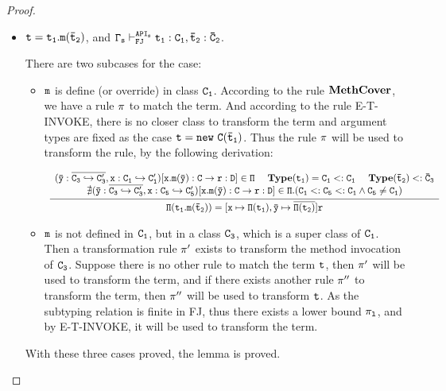\documentclass[letterpaper]{article}
\newcommand{\env}[2]{\vdash_{#1}^{#2}}
\begin{document}
\begin{proof}
\begin{itemize}
  \item $\tt t = t_1.m(\bar{t}_2)$, and $\tt \Gamma_s\env{FJ}{API_s}t_1:C_1,\bar{t}_2:\bar{C}_2$.
  
  There are two subcases for the case:
    \begin{itemize}
      \item $\tt m$ is define (or override) in class $\tt C_1$. According to the rule $\tt \mathbf{MethCover}$, we have a rule $\tt \pi$ to match the term. And according to the rule E-T-INVOKE, there is no closer class to transform the term and argument types are fixed as the case $\tt t=new~C(\bar{t}_1)$. Thus the rule $\tt \pi$ will be used to transform the rule, by the following derivation:

      \[
        \begin{array}{c}
          \infer
          {\tt \Pi(t_1.m(\bar{t}_2))=[x\mapsto\Pi(t_1), \bar{y}\mapsto\overline{\Pi(t_2)}]r}
          {
            \begin{array}{c c}
              \tt (\bar{y}:\overline{C_3\hookrightarrow C'_3}, x:C_1\hookrightarrow C'_1)[x.m(\bar{y}):C\rightarrow r:D]\in\Pi ~~~~
              \tt \mathbf{Type}(t_1) = C_1 <: C_1 ~~~~ \mathbf{Type}(\bar{t}_2)<:\bar{C}_3 \\
              \tt \nexists (\bar{y}:\overline{C_3\hookrightarrow C'_3}, x:C_5\hookrightarrow C'_5)[x.m(\bar{y}):C\rightarrow r:D]\in\Pi.(C_1<:C_5<:C_1 \land C_5\neq C_1)
            \end{array}
          }
        \end{array}
      \]

      \item $\tt m$ is not defined in $\tt C_1$, but in a class $\tt C_3$, which is a super class of $\tt C_1$. Then a transformation rule $\tt \pi'$ exists to transform the method invocation of $\tt C_3$. Suppose there is no other rule to match the term $\tt t$, then $\tt \pi'$ will be used to transform the term, and if there exists another rule $\tt \pi''$ to transform the term, then $\tt \pi''$ will be used to transform $\tt t$. As the subtyping relation is finite in FJ, thus there exists a lower bound $\tt\pi_l$, and by E-T-INVOKE, it will be used to transform the term. 
    \end{itemize}

  With these three cases proved, the lemma is proved.
\end{itemize}
\end{proof}
\end{document}
